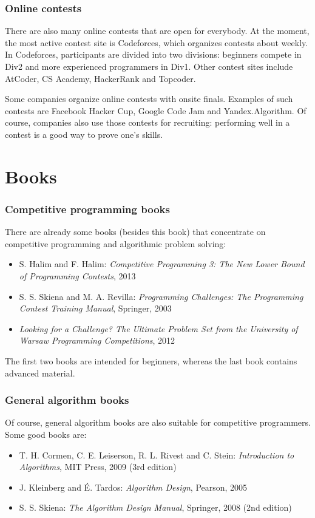 \subsubsection{Online contests}

There are also many online contests that are open for everybody.
At the moment, the most active contest site is Codeforces,
which organizes contests about weekly.
In Codeforces, participants are divided into two divisions:
beginners compete in Div2 and more experienced programmers in Div1.
Other contest sites include AtCoder, CS Academy, HackerRank and Topcoder.

Some companies organize online contests with onsite finals.
Examples of such contests are Facebook Hacker Cup,
Google Code Jam and Yandex.Algorithm.
Of course, companies also use those contests for recruiting:
performing well in a contest is a good way to prove one's skills.

\section{Books}

\subsubsection{Competitive programming books}

There are already some books (besides this book) that
concentrate on competitive programming and algorithmic problem solving:

\begin{itemize}
\item S. Halim and F. Halim:
\emph{Competitive Programming 3: The New Lower Bound of Programming Contests}, 2013
\item S. S. Skiena and M. A. Revilla:
\emph{Programming Challenges: The Programming Contest Training Manual},
Springer, 2003
\item \emph{Looking for a Challenge? The Ultimate Problem Set from
the University of Warsaw Programming Competitions}, 2012
\end{itemize}

The first two books are intended for beginners,
whereas the last book contains advanced material.

\subsubsection{General algorithm books}

Of course, general algorithm books are also suitable for
competitive programmers.
Some good books are:

\begin{itemize}
\item T. H. Cormen, C. E. Leiserson, R. L. Rivest and C. Stein:
\emph{Introduction to Algorithms}, MIT Press, 2009 (3rd edition)
\item J. Kleinberg and É. Tardos:
\emph{Algorithm Design}, Pearson, 2005
\item S. S. Skiena:
\emph{The Algorithm Design Manual}, Springer, 2008 (2nd edition)
\end{itemize}
